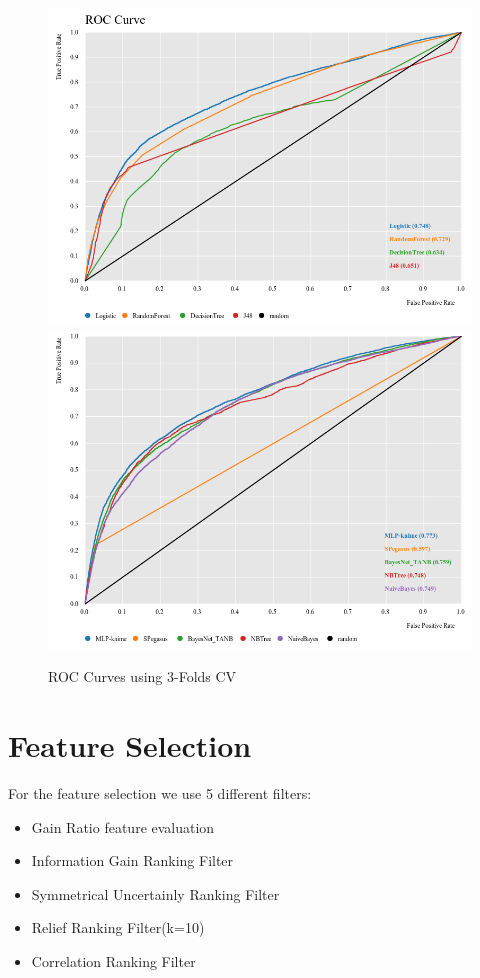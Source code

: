 \documentclass[fleqn,10pt]{SelfArx} %
\begin{document}
\begin{figure}[h!]
	\includegraphics[width=\linewidth]{ROC_III.png}
	\includegraphics[width=\linewidth]{ROC_IandII.png}
	\caption{ROC Curves using 3-Folds CV}
	\label{fig:ROC_3fcv}
\end{figure}


\section{Feature Selection}
For the feature selection we use 5 different filters:
\begin{itemize}[noitemsep]
	\item Gain Ratio feature evaluation
	\item Information Gain Ranking Filter
	\item Symmetrical Uncertainly Ranking Filter
	\item Relief Ranking Filter(k=10)
	\item Correlation Ranking Filter
\end{itemize}
\end{document}

